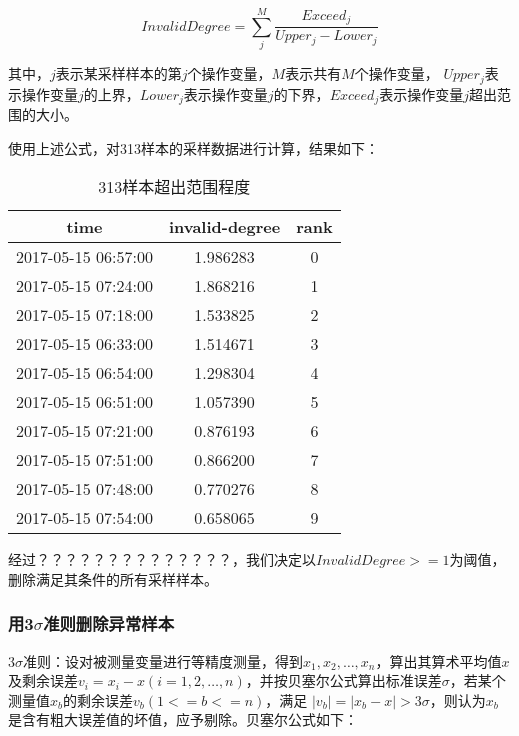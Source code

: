 \documentclass[bwprint]{gmcmthesis}
\begin{document}
\begin{equation}
	InvalidDegree=\sum^M_j{\frac{Exceed_j}{Upper_j - Lower_j}}
	\label{eq:range-invalid-degree}
\end{equation}

其中，$j$表示某采样样本的第$j$个操作变量，$M$表示共有$M$个操作变量， $Upper_j$表示操作变量$j$的上界，$Lower_j$表示操作变量$j$的下界，$Exceed_j$表示操作变量$j$超出范围的大小。

使用上述公式，对313样本的采样数据进行计算，结果如下：

\begin{table}[htb]
	\caption{313样本超出范围程度}\label{tab:001} \centering
	\begin{tabular}{ccc}
	\toprule[1.5pt]
	time &  invalid-degree &  rank \\
	\midrule[1pt]
	2017-05-15 06:57:00 &        1.986283 &     0 \\
	2017-05-15 07:24:00 &        1.868216 &     1 \\
	2017-05-15 07:18:00 &        1.533825 &     2 \\
	2017-05-15 06:33:00 &        1.514671 &     3 \\
	2017-05-15 06:54:00 &        1.298304 &     4 \\
	2017-05-15 06:51:00 &        1.057390 &     5 \\
	2017-05-15 07:21:00 &        0.876193 &     6 \\
	2017-05-15 07:51:00 &        0.866200 &     7 \\
	2017-05-15 07:48:00 &        0.770276 &     8 \\
	2017-05-15 07:54:00 &        0.658065 &     9 \\
	\bottomrule[1.5pt]
\end{tabular}
\end{table}


经过？？？？？？？？？？？？？？，我们决定以$InvalidDegree >= 1$为阈值，删除满足其条件的所有采样样本。



\FloatBarrier
\subsubsection{用3$\sigma$准则删除异常样本}

3$\sigma$准则：设对被测量变量进行等精度测量，得到$x_1, x_2, \ldots, x_n$，算出其算术平均值$x$及剩余误差$v_i=x_i-x (i=1, 2, \ldots , n)$，并按贝塞尔公式算出标准误差$\sigma$，若某个测量值$x_b$的剩余误差$v_b ( 1 <= b <= n )$，满足 $|v_b| = | x_b - x | > 3\sigma$，则认为$x_b$是含有粗大误差值的坏值，应予剔除。贝塞尔公式如下：
\end{document}

